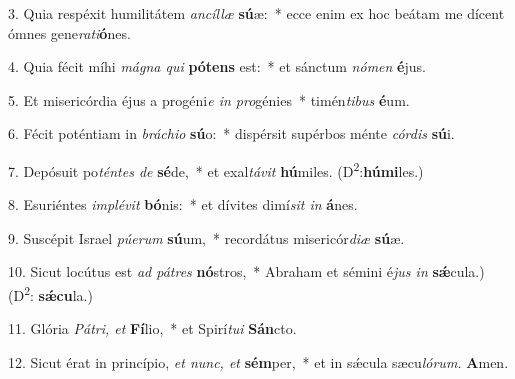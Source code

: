 \item 3. Quia respéxit humilitátem \textit{ancíllæ} \textbf{sú}æ:~* ecce enim ex hoc beátam me dícent ómnes gene\textit{rati}\textbf{ó}nes.

\item 4. Quia fécit míhi \textit{mágna qui} \textbf{pótens} est:~* et sánctum \textit{nómen} \textbf{é}jus.

\item 5. Et misericórdia éjus a progéni\textit{e in pro}génies~* timén\textit{tibus} \textbf{é}um.

\item 6. Fécit poténtiam in \textit{bráchio} \textbf{sú}o:~* dispérsit supérbos ménte \textit{córdis} \textbf{sú}i.

\item 7. Depósuit po\textit{téntes de} \textbf{sé}de,~* et exal\textit{távit} \textbf{hú}miles. (D\textsuperscript{2}:\textbf{húmi}les.)

\item 8. Esuriéntes \textit{implévit}  \textbf{bó}nis:~* et dívites dimí\textit{sit in} \textbf{á}nes.

\item 9. Suscépit Israel \textit{púerum}  \textbf{sú}um,~* recordátus misericór\textit{diæ} \textbf{sú}æ.

\item 10. Sicut locútus est \textit{ad pátres} \textbf{nó}stros,~* Abraham et sémini é\textit{jus in} \textbf{sǽ}cula.) (D\textsuperscript{2}: \textbf{sǽcu}la.)

\item 11. Glória \textit{Pátri, et} \textbf{Fí}lio,~* et Spirí\textit{tui} \textbf{Sán}cto.

\item 12. Sicut érat in princípio, \textit{et nunc, et} \textbf{sém}per,~* et in sǽcula sæcu\textit{lórum.} \textbf{A}men.